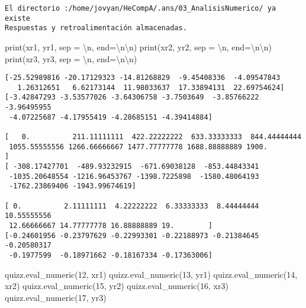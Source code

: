 \documentclass[
  letterpaper,
  DIV=11,
  numbers=noendperiod]{scrreprt}
\newenvironment{Shaded}{\begin{snugshade}}{\end{snugshade}}
\newcommand{\BuiltInTok}[1]{\textcolor[rgb]{0.00,0.23,0.31}{#1}}
\newcommand{\CharTok}[1]{\textcolor[rgb]{0.13,0.47,0.30}{#1}}
\newcommand{\NormalTok}[1]{\textcolor[rgb]{0.00,0.23,0.31}{#1}}
\newcommand{\OperatorTok}[1]{\textcolor[rgb]{0.37,0.37,0.37}{#1}}
\newcommand{\StringTok}[1]{\textcolor[rgb]{0.13,0.47,0.30}{#1}}
\begin{document}
\begin{verbatim}
El directorio :/home/jovyan/HeCompA/.ans/03_AnalisisNumerico/ ya existe
Respuestas y retroalimentación almacenadas.
\end{verbatim}

\begin{Shaded}
\begin{Highlighting}[]
\BuiltInTok{print}\NormalTok{(xr1, yr1, sep }\OperatorTok{=} \StringTok{\textquotesingle{}}\CharTok{\textbackslash{}n}\StringTok{\textquotesingle{}}\NormalTok{, end}\OperatorTok{=}\StringTok{\textquotesingle{}}\CharTok{\textbackslash{}n\textbackslash{}n}\StringTok{\textquotesingle{}}\NormalTok{)}
\BuiltInTok{print}\NormalTok{(xr2, yr2, sep }\OperatorTok{=} \StringTok{\textquotesingle{}}\CharTok{\textbackslash{}n}\StringTok{\textquotesingle{}}\NormalTok{, end}\OperatorTok{=}\StringTok{\textquotesingle{}}\CharTok{\textbackslash{}n\textbackslash{}n}\StringTok{\textquotesingle{}}\NormalTok{)}
\BuiltInTok{print}\NormalTok{(xr3, yr3, sep }\OperatorTok{=} \StringTok{\textquotesingle{}}\CharTok{\textbackslash{}n}\StringTok{\textquotesingle{}}\NormalTok{, end}\OperatorTok{=}\StringTok{\textquotesingle{}}\CharTok{\textbackslash{}n\textbackslash{}n}\StringTok{\textquotesingle{}}\NormalTok{)}
\end{Highlighting}
\end{Shaded}

\begin{verbatim}
[-25.52989816 -20.17129323 -14.81268829  -9.45408336  -4.09547843
   1.26312651   6.62173144  11.98033637  17.33894131  22.69754624]
[-3.42847293 -3.53577026 -3.64306758 -3.7503649  -3.85766222 -3.96495955
 -4.07225687 -4.17955419 -4.28685151 -4.39414884]

[   0.          211.11111111  422.22222222  633.33333333  844.44444444
 1055.55555556 1266.66666667 1477.77777778 1688.88888889 1900.        ]
[ -308.17427701  -489.93232915  -671.69038128  -853.44843341
 -1035.20648554 -1216.96453767 -1398.7225898  -1580.48064193
 -1762.23869406 -1943.99674619]

[ 0.          2.11111111  4.22222222  6.33333333  8.44444444 10.55555556
 12.66666667 14.77777778 16.88888889 19.        ]
[-0.24601956 -0.23797629 -0.22993301 -0.22188973 -0.21384645 -0.20580317
 -0.1977599  -0.18971662 -0.18167334 -0.17363006]
\end{verbatim}

\begin{Shaded}
\begin{Highlighting}[]
\NormalTok{quizz.eval\_numeric(}\StringTok{\textquotesingle{}12\textquotesingle{}}\NormalTok{, xr1)}
\NormalTok{quizz.eval\_numeric(}\StringTok{\textquotesingle{}13\textquotesingle{}}\NormalTok{, yr1)}
\NormalTok{quizz.eval\_numeric(}\StringTok{\textquotesingle{}14\textquotesingle{}}\NormalTok{, xr2)}
\NormalTok{quizz.eval\_numeric(}\StringTok{\textquotesingle{}15\textquotesingle{}}\NormalTok{, yr2)}
\NormalTok{quizz.eval\_numeric(}\StringTok{\textquotesingle{}16\textquotesingle{}}\NormalTok{, xr3)}
\NormalTok{quizz.eval\_numeric(}\StringTok{\textquotesingle{}17\textquotesingle{}}\NormalTok{, yr3)}
\end{Highlighting}
\end{Shaded}
\end{document}
